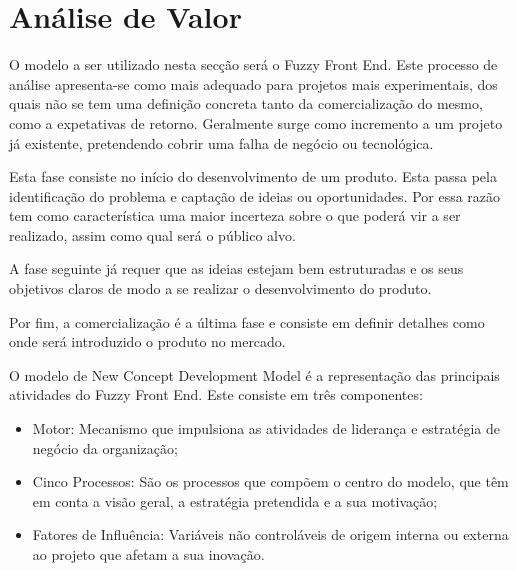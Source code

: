 \chapter{Análise de Valor}
\label{cap:3}

O modelo a ser utilizado nesta secção será o Fuzzy Front End. Este processo de análise apresenta-se como mais adequado para projetos mais experimentais, dos quais não se tem uma definição concreta tanto da comercialização do mesmo, como a expetativas de retorno. Geralmente surge como incremento a um projeto já existente, pretendendo cobrir uma falha de negócio ou tecnológica.

Esta fase consiste no início do desenvolvimento de um produto. Esta passa pela identificação do problema e captação de ideias ou oportunidades. Por essa razão tem como característica uma maior incerteza sobre o que poderá vir a ser realizado, assim como qual será o público alvo.

A fase seguinte já requer que as ideias estejam bem estruturadas e os seus objetivos claros de modo a se realizar o desenvolvimento do produto.

Por fim, a comercialização é a última fase e consiste em definir detalhes como onde será introduzido o produto no mercado.

O modelo de New Concept Development Model é a representação das principais atividades do Fuzzy Front End. Este consiste em três componentes:

\begin{itemize}

\item Motor: Mecanismo que impulsiona as atividades de liderança e estratégia de negócio da organização;

\item Cinco Processos: São os processos que compõem o centro do modelo, que têm em conta a visão geral, a estratégia pretendida e a sua motivação;

\item Fatores de Influência: Variáveis não controláveis de origem interna ou externa ao projeto que afetam a sua inovação.

\end{itemize}

